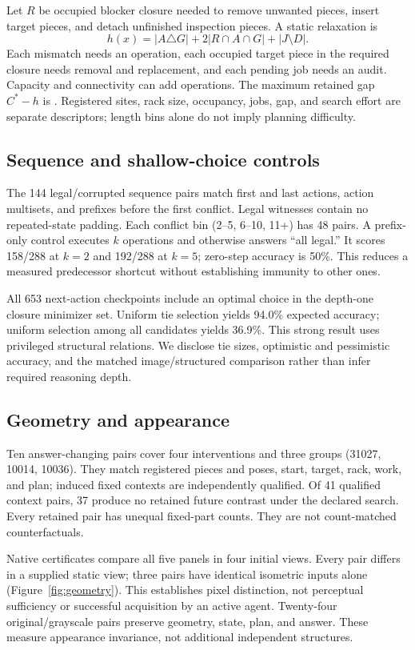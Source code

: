 \documentclass[10pt,twocolumn,letterpaper]{article}
\begin{document}
Let $R$ be occupied blocker closure needed to remove unwanted pieces,
insert target pieces, and detach unfinished inspection pieces. A static
relaxation is
\begin{equation}
 h(x)=|A\triangle G|+2|R\cap A\cap G|+|J\setminus D|.
\end{equation}
Each mismatch needs an operation, each occupied target piece in the
required closure needs removal and replacement, and each pending job
needs an audit. Capacity and connectivity can add operations. The maximum
retained gap $C^*-h$ is \MaxGap{}. Registered sites, rack size, occupancy,
jobs, gap, and search effort are separate descriptors; length bins alone
do not imply planning difficulty.

\subsection{Sequence and shallow-choice controls}
The 144 legal/corrupted sequence pairs match first and last actions,
action multisets, and prefixes before the first conflict. Legal witnesses
contain no repeated-state padding. Each conflict bin (2--5, 6--10, 11+)
has 48 pairs. A prefix-only control executes $k$ operations and otherwise
answers ``all legal.'' It scores 158/288 at $k=2$ and 192/288 at $k=5$;
zero-step accuracy is 50\%. This reduces a measured predecessor shortcut
without establishing immunity to other ones.

All 653 next-action checkpoints include an optimal choice in the
depth-one closure minimizer set. Uniform tie selection yields 94.0\%
expected accuracy; uniform selection among all candidates yields 36.9\%.
This strong result uses privileged structural relations. We disclose
tie sizes, optimistic and pessimistic accuracy, and the matched
image/structured comparison rather than infer required reasoning depth.

\subsection{Geometry and appearance}
Ten answer-changing pairs cover four interventions and three groups
(31027, 10014, 10036). They match registered pieces and poses, start,
target, rack, work, and plan; induced fixed contexts are independently
qualified. Of 41 qualified context pairs, 37 produce no retained
future contrast under the declared search. Every retained pair has
unequal fixed-part counts. They are not count-matched counterfactuals.

Native certificates compare all five panels in four initial views.
Every pair differs in a supplied static view; three pairs have identical
isometric inputs alone (Figure~\ref{fig:geometry}). This establishes pixel
distinction, not perceptual sufficiency or successful acquisition by an
active agent. Twenty-four original/grayscale pairs preserve geometry,
state, plan, and answer. These measure appearance invariance, not
additional independent structures.
\end{document}
